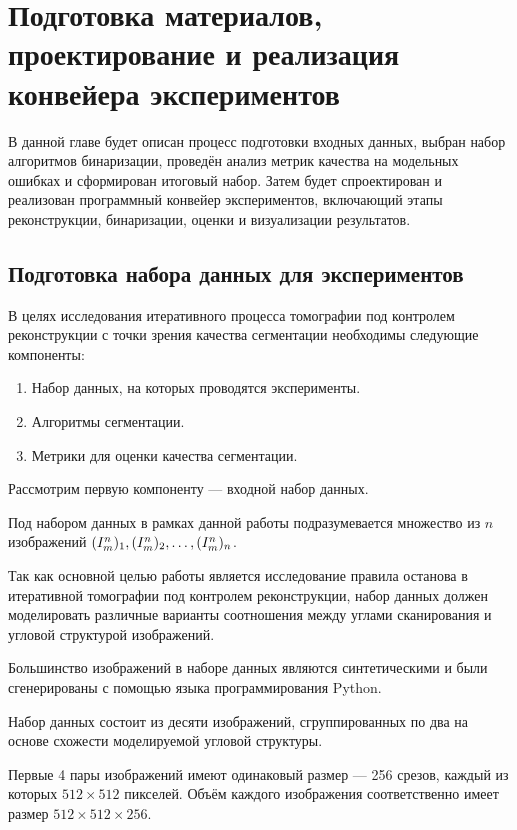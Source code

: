\section{Подготовка материалов, проектирование и реализация конвейера экспериментов}

В данной главе будет описан процесс подготовки входных данных, выбран набор алгоритмов бинаризации, проведён анализ метрик качества на модельных ошибках и сформирован итоговый набор. Затем будет спроектирован и реализован программный конвейер экспериментов, включающий этапы реконструкции, бинаризации, оценки и визуализации результатов.

\subsection{Подготовка набора данных для экспериментов}

В целях исследования итеративного процесса томографии под контролем реконструкции с точки зрения качества сегментации необходимы следующие компоненты:
\begin{enumerate}
    \item Набор данных, на которых проводятся эксперименты.
    \item Алгоритмы сегментации.
    \item Метрики для оценки качества сегментации.
\end{enumerate}   

Рассмотрим первую компоненту — входной набор данных.

Под набором данных в рамках данной работы подразумевается множество из \(n\) изображений \( (I^n_m)_1, (I^n_m)_2, \ldots, (I^n_m)_n \). 

Так как основной целью работы является исследование правила останова в итеративной томографии под контролем реконструкции, набор данных должен моделировать различные варианты соотношения между углами сканирования и угловой структурой изображений.

Большинство изображений в наборе данных являются синтетическими и были сгенерированы с помощью языка программирования Python.

Набор данных состоит из десяти изображений, сгруппированных по два на основе схожести моделируемой угловой структуры.

Первые 4 пары изображений имеют одинаковый размер — 256 срезов, каждый из которых \(512 \times 512\) пикселей. Объём каждого изображения соответственно имеет размер \(512 \times 512 \times 256\).

